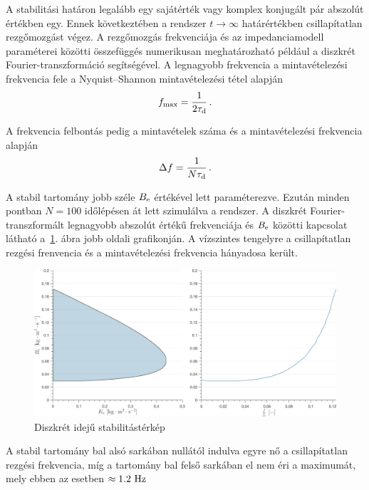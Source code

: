 A stabilitási határon legalább egy sajátérték vagy komplex konjugált pár abszolút értékben egy. Ennek következtében a rendszer 
\(t\rightarrow\infty\) határértékben csillapítatlan rezgőmozgást végez. A rezgőmozgás frekvenciája és az 
impedanciamodell paraméterei közötti összefüggés numerikusan meghatározható például a diszkrét 
Fourier-transzformáció segítségével. A legnagyobb frekvencia a mintavételezési frekvencia fele a Nyquist--Shannon 
mintavételezési tétel alapján 
\begin{align}
    f_{\mathrm{max}} = \frac{1}{2\tau_{\mathrm{d}}}\,.
\end{align}

A frekvencia felbontás pedig a mintavételek száma és a mintavételezési frekvencia alapján
\begin{align}
    \Delta f = \frac{1}{N\tau_{\mathrm{d}}}\,.
\end{align}

A stabil tartomány jobb széle \(B_{\mathrm{e}}\) értékével lett paraméterezve. Ezután minden pontban  
\(N = 100\) időlépésen át lett szimulálva a rendszer. A diszkrét Fourier-transzformált 
legnagyobb abszolút értékű frekvenciája és \(B_{\mathrm{e}}\) közötti kapcsolat látható 
a~\ref{fig:time_delay_stab_map_discrete_fourier}. ábra jobb oldali grafikonján. A vízszintes 
tengelyre a csillapítatlan rezgési frenvencia és a mintavételezési frekvencia hányadosa került.
\begin{figure}[H]
    \begin{center}
    \includegraphics[width=\textwidth]{images/time_delay_stab_map_discrete_fourier.png}
    \caption{Diszkrét idejű stabilitástérkép}\label{fig:time_delay_stab_map_discrete_fourier}
    \end{center}
\end{figure}
A stabil tartomány bal alsó sarkában nullától indulva egyre nő a csillapítatlan 
rezgési frekvencia, míg a tartomány bal felső sarkában el nem éri a maximumát, mely ebben az 
esetben \(\approx 1.2~\mathrm{Hz}\)
